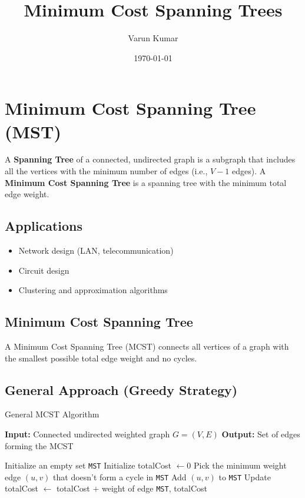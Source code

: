 \documentclass[14pt,a4paper]{extarticle}
\title{Minimum Cost Spanning Trees}
\author{Varun Kumar}
\date{\today}
\begin{document}
\maketitle
\tableofcontents
\lstlistoflistings
\newpage
\section{Minimum Cost Spanning Tree (MST)}

A \textbf{Spanning Tree} of a connected, undirected graph is a subgraph that includes 
all the vertices with the minimum number of edges (i.e., $V-1$ edges). 
A \textbf{Minimum Cost Spanning Tree} is a spanning tree with the minimum total edge weight.

\subsection*{Applications}
\begin{itemize}
    \item Network design (LAN, telecommunication)
    \item Circuit design
    \item Clustering and approximation algorithms
\end{itemize}

\subsection{Minimum Cost Spanning Tree}

A Minimum Cost Spanning Tree (MCST) connects all vertices of a graph with the smallest possible total edge weight and no cycles.

\subsection{General Approach (Greedy Strategy)}

\begin{algorithm}[H]
\caption{General MCST Algorithm}
\begin{algorithmic}[1]
\State \textbf{Input:} Connected undirected weighted graph \(G = (V, E)\)
\State \textbf{Output:} Set of edges forming the MCST

    \State Initialize an empty set \texttt{MST}
    \State Initialize totalCost \( \gets 0 \)
        \State Pick the minimum weight edge \( (u, v) \) that doesn't form a cycle in \texttt{MST}
        \State Add \( (u, v) \) to \texttt{MST}
        \State Update totalCost \( \gets \) totalCost $+$ weight of edge
    \EndWhile
    \State \Return \texttt{MST}, totalCost
\EndFunction
\end{algorithmic}
\end{algorithm}
\end{document}
